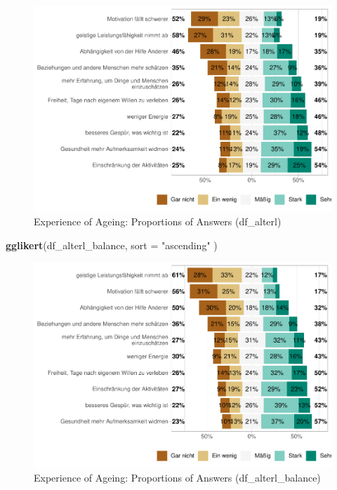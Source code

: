 \documentclass[
  doc]{apa6}
\newenvironment{Shaded}{\begin{snugshade}}{\end{snugshade}}
\newcommand{\AttributeTok}[1]{\textcolor[rgb]{0.13,0.29,0.53}{#1}}
\newcommand{\FunctionTok}[1]{\textcolor[rgb]{0.13,0.29,0.53}{\textbf{#1}}}
\newcommand{\NormalTok}[1]{#1}
\newcommand{\StringTok}[1]{\textcolor[rgb]{0.31,0.60,0.02}{#1}}
\begin{document}
\begin{figure}
\centering
\includegraphics{desc_NRW80_files/figure-latex/likertalterl1-1.pdf}
\caption{\label{fig:likertalterl1}Experience of Ageing: Proportions of Answers (df\_alterl)}
\end{figure}

\begin{Shaded}
\begin{Highlighting}[]
\FunctionTok{gglikert}\NormalTok{(df\_alterl\_balance,}
         \AttributeTok{sort =} \StringTok{"ascending"}
\NormalTok{         )}
\end{Highlighting}
\end{Shaded}

\begin{figure}
\centering
\includegraphics{desc_NRW80_files/figure-latex/likertalterl2-1.pdf}
\caption{\label{fig:likertalterl2}Experience of Ageing: Proportions of Answers (df\_alterl\_balance)}
\end{figure}
\end{document}
